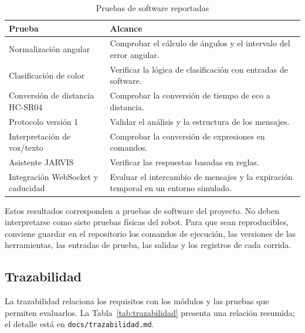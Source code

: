 \documentclass[journal]{IEEEtran}
\begin{document}
\begin{table}[t]
\centering
\caption{Pruebas de software reportadas}
\label{tab:pruebas}
\scriptsize
\begin{tabular}{p{} p{}}
\toprule
\textbf{Prueba} & \textbf{Alcance} \\
\midrule
Normalización angular & Comprobar el cálculo de ángulos y el intervalo del error angular. \\
Clasificación de color & Verificar la lógica de clasificación con entradas de software. \\
Conversión de distancia HC-SR04 & Comprobar la conversión de tiempo de eco a distancia. \\
Protocolo versión 1 & Validar el análisis y la estructura de los mensajes. \\
Interpretación de voz/texto & Comprobar la conversión de expresiones en comandos. \\
Asistente JARVIS & Verificar las respuestas basadas en reglas. \\
Integración WebSocket y caducidad & Evaluar el intercambio de mensajes y la expiración temporal en un entorno simulado. \\
\bottomrule
\end{tabular}
\end{table}

Estos resultados corresponden a pruebas de software del proyecto. No deben interpretarse como siete pruebas físicas del robot. Para que sean reproducibles, conviene guardar en el repositorio los comandos de ejecución, las versiones de las herramientas, las entradas de prueba, las salidas y los registros de cada corrida.

\subsection{Trazabilidad}

La trazabilidad relaciona los requisitos con los módulos y las pruebas que permiten evaluarlos. La Tabla~\ref{tab:trazabilidad} presenta una relación resumida; el detalle está en \texttt{docs/trazabilidad.md}.
\end{document}
